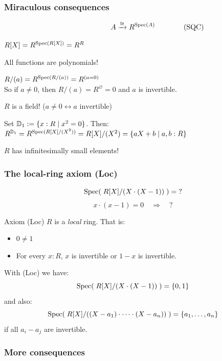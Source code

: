 \documentclass[aspectratio=1610]{beamer}
\begin{document}
\begin{frame}
  \frametitle{Miraculous consequences}

  \[A \xrightarrow{\cong} R^{\Spec(A)} \rlap{\qquad\qquad \text{(SQC)}}\]

  \pause%
  \begin{corollary}
    $R[X] = R^{\operatorname{Spec}(R[X])} = R^R$
  \end{corollary}
  \pause%
  \alert{All functions are polynomials!}

  \pause%
  \begin{corollary}
    $R/(a) = R^{\operatorname{Spec}(R/(a))} = R^{(a = 0)}$\\
    So if $a \neq 0$, then $R/(a) = R^{\varnothing} = 0$ and $a$ is invertible.
  \end{corollary}
  \pause%
  \alert{$R$ is a field! ($a \neq 0 \leftrightarrow \text{$a$ invertible}$)}

  \pause%
  \begin{corollary}
    Set $\mathbb{D}_1 := \{x : R \mid x^2 = 0\}$. Then:\\
    $R^{\mathbb{D}_1} = R^{\operatorname{Spec}(R[X]/(X^2))} = R[X]/(X^2) = \{ aX + b \mid a, b : R \}$
  \end{corollary}
  \pause%
  \alert{$R$ has infinitesimally small elements!}
\end{frame}

\begin{frame}
  \frametitle{The local-ring axiom (Loc)}

  \[ \operatorname{Spec}(\;R[X]/(X\cdot(X-1))\;) = \text{?} \]
  \[ x \cdot (x-1) = 0 \quad \Rightarrow \quad \text{?} \]

  \pause%
  \bigskip
  \begin{block}{Axiom (Loc)}
    $R$ is a \emph{local} ring.
    That is:
    \begin{itemize}
      \item
        $0 \neq 1$
      \item
        For every $x : R$,
        $x$ is invertible or $1 - x$ is invertible.
    \end{itemize}
  \end{block}

  \bigskip
  With (Loc) we have:
  \[ \operatorname{Spec}(\;R[X]/(X\cdot(X-1))\;) = \{0, 1\} \]
  \pause%
  and also:
  \[ \operatorname{Spec}(\;R[X]/((X-a_1)\cdot \dots \cdot(X-a_n))\;) = \{a_1, \dots, a_n\} \]
  if all $a_i - a_j$ are invertible.
\end{frame}

\begin{frame}
  \frametitle{More consequences}
\end{frame}
\end{document}
